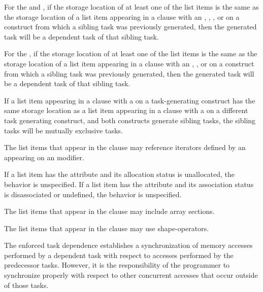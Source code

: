 For the  and  , if the storage location of at least one
of the list items is the same as the storage location of a list item appearing
in a  clause with an , , , or   on
a construct from which a sibling task was previously generated, then the
generated task will be a dependent task of that sibling task.

For the  , if the storage location of at least one
of the list items is the same as the storage location of a list item appearing
in a  clause with an , , or   on
a construct from which a sibling task was previously generated, then the
generated task will be a dependent task of that sibling task.

If a list item appearing in a  clause with a 
 on a task-generating construct has the same storage location as
a list item appearing in a  clause with a 
 on a different task generating construct, and both constructs
generate sibling tasks, the sibling tasks will be mutually exclusive tasks.

The list items that appear in the  clause may reference iterators
defined by an  appearing on an  modifier.

\begin{fortranspecific}
If a list item has the  attribute and its allocation
status is unallocated, the behavior is unspecified. If a list item has
the  attribute and its association status is
disassociated or undefined, the behavior is unspecified.
\end{fortranspecific}

The list items that appear in the  clause may include array sections.

\begin{ccppspecific}
The list items that appear in the  clause may use shape-operators.
\end{ccppspecific}

\begin{note}
The enforced task dependence establishes a synchronization of memory
accesses performed by a dependent task with respect to accesses performed by the
predecessor tasks. However, it is the responsibility of the programmer to synchronize properly with respect to other concurrent accesses that occur outside of those tasks.
\end{note}

